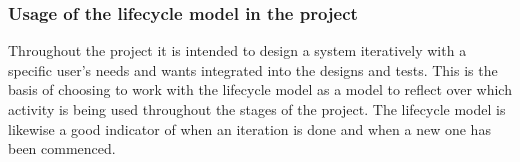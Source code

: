 \subsubsection{Usage of the lifecycle model in the project}
Throughout the project it is intended to design a system iteratively with a specific user’s needs and wants integrated into the designs and tests.
This is the basis of choosing to work with the lifecycle model as a model to reflect over which activity is being used throughout the stages of the project.
The lifecycle model is likewise a good indicator of when an iteration is done and when a new one has been commenced.




